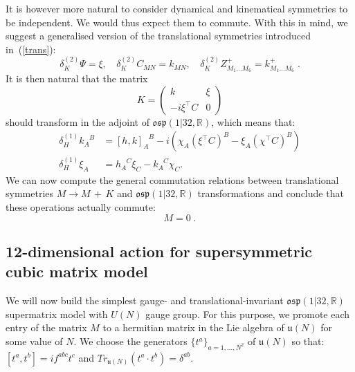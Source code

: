 \documentclass[a4paper,11pt]{article}
\begin{document}
It is however more natural to consider dynamical and kinematical symmetries to be independent.
We would thus expect them to commute. With this in mind, we suggest a generalised version of 
the translational symmetries introduced in~(\ref{trans}):
\begin{equation}
\delta_{K}^{(2)} \Psi = \xi, \phantom{ab}
\delta_{K}^{(2)} C_{MN} = k_{MN}, \phantom{ab}
\delta_{K}^{(2)} Z^+_{M_1 \ldots M_6} = k^+_{M_1 \ldots M_6}\;.
\end{equation}
It is then natural that the matrix
\begin{equation}
K=\begin{pmatrix}
k & \xi \\
-i \xi^{\top} C & 0
\end{pmatrix}
\end{equation}
should transform in the adjoint of $\mathfrak{osp}(1|32,\mathbb{R})$, which means that:
\begin{align}
\delta_{H}^{(1)} k_A^{\phantom{A}B} &= 
[h,k]_A^{\phantom{A}B} - i (\chi_A (\xi^{\top} C)^B - \xi_A (\chi^{\top} C)^B) \\
\delta_{H}^{(1)} \xi_A &= h_A^{\phantom{A}C} \xi_C - k_A^{\phantom{A}C} \chi_C. 
\end{align}
We can now compute the general commutation relations between translational symmetries $M \rightarrow M\,+\,K$ and
$\mathfrak{osp}(1|32,\mathbb{R})$ transformations and conclude that these operations actually 
commute:
\begin{equation}
[\delta_{H}^{(1)},\delta_{K}^{(2)}] M = 0\;.
\end{equation}

\subsection{12-dimensional action for supersymmetric cubic matrix model} 
We will now build the simplest gauge- and translational-invariant 
$\mathfrak{osp}(1|32,\mathbb{R})$ supermatrix model with $U(N)$ gauge group. 
For this purpose, we promote each entry of the matrix $M$ to a hermitian matrix in the Lie algebra
of $\mathfrak{u}(N)$ for some value of $N$. We choose the generators $\{t^a\}_{a=1, \ldots , N^2}$ of 
$\mathfrak{u}(N)$ so that: $[t^a,t^b]=if^{abc}t^c$ and $Tr_{\mathfrak{u}(N)}(t^a \cdot t^b)=\delta^{ab}$.
\end{document}
